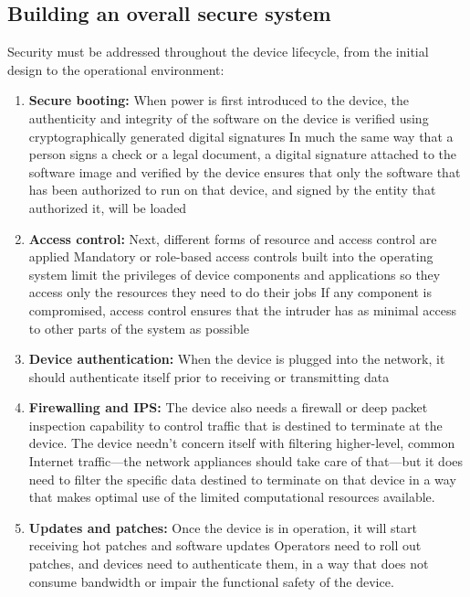 \documentclass{article}
\begin{document}
\begin{multicols}{2}
\begin{enumerate}
\subsection*{Building an overall secure system}
Security must be addressed throughout the device lifecycle, from the initial design to the operational environment:
\begin{enumerate}
\item \textbf{Secure booting:} When power is first introduced to the device,
the authenticity and integrity of the software on the device is
verified using cryptographically generated digital signatures
In much the same way that a person signs a check or a legal
document, a digital signature attached to the software image
and verified by the device ensures that only the software that
has been authorized to run on that device, and signed by the
entity that authorized it, will be loaded 
\item \textbf{Access control:} Next, different forms of resource and access
control are applied Mandatory or role-based access controls
built into the operating system limit the privileges of device
components and applications so they access only the resources
they need to do their jobs If any component is compromised,
access control ensures that the intruder has as minimal access
to other parts of the system as possible
\item \textbf{Device authentication:} When the device is plugged into the
network, it should authenticate itself prior to receiving or transmitting data
\item \textbf{Firewalling and IPS:} The device also needs a firewall or deep
packet inspection capability to control traffic that is destined
to terminate at the device. The device needn’t concern
itself with filtering higher-level, common Internet traffic—the
network appliances should take care of that—but it does need
to filter the specific data destined to terminate on that device
in a way that makes optimal use of the limited computational
resources available.
\item \textbf{Updates and patches:} Once the device is in operation, it will
start receiving hot patches and software updates Operators
need to roll out patches, and devices need to authenticate
them, in a way that does not consume bandwidth or impair
the functional safety of the device.
\end{enumerate}
\end{enumerate}
\end{multicols}
\end{document}
